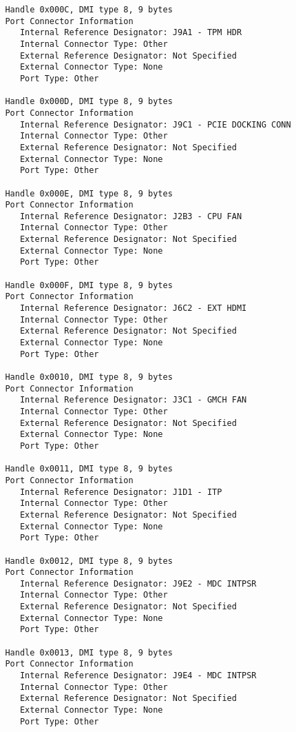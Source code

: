 \documentclass[11pt]{article}
\begin{document}
\begin{tiny}
\begin{verbatim}
         Handle 0x000C, DMI type 8, 9 bytes
         Port Connector Information
            Internal Reference Designator: J9A1 - TPM HDR
            Internal Connector Type: Other
            External Reference Designator: Not Specified
            External Connector Type: None
            Port Type: Other
         
         Handle 0x000D, DMI type 8, 9 bytes
         Port Connector Information
            Internal Reference Designator: J9C1 - PCIE DOCKING CONN
            Internal Connector Type: Other
            External Reference Designator: Not Specified
            External Connector Type: None
            Port Type: Other
         
         Handle 0x000E, DMI type 8, 9 bytes
         Port Connector Information
            Internal Reference Designator: J2B3 - CPU FAN
            Internal Connector Type: Other
            External Reference Designator: Not Specified
            External Connector Type: None
            Port Type: Other
         
         Handle 0x000F, DMI type 8, 9 bytes
         Port Connector Information
            Internal Reference Designator: J6C2 - EXT HDMI
            Internal Connector Type: Other
            External Reference Designator: Not Specified
            External Connector Type: None
            Port Type: Other
         
         Handle 0x0010, DMI type 8, 9 bytes
         Port Connector Information
            Internal Reference Designator: J3C1 - GMCH FAN
            Internal Connector Type: Other
            External Reference Designator: Not Specified
            External Connector Type: None
            Port Type: Other
         
         Handle 0x0011, DMI type 8, 9 bytes
         Port Connector Information
            Internal Reference Designator: J1D1 - ITP
            Internal Connector Type: Other
            External Reference Designator: Not Specified
            External Connector Type: None
            Port Type: Other
         
         Handle 0x0012, DMI type 8, 9 bytes
         Port Connector Information
            Internal Reference Designator: J9E2 - MDC INTPSR
            Internal Connector Type: Other
            External Reference Designator: Not Specified
            External Connector Type: None
            Port Type: Other
         
         Handle 0x0013, DMI type 8, 9 bytes
         Port Connector Information
            Internal Reference Designator: J9E4 - MDC INTPSR
            Internal Connector Type: Other
            External Reference Designator: Not Specified
            External Connector Type: None
            Port Type: Other
         

\end{verbatim}
\end{tiny}
\end{document}
